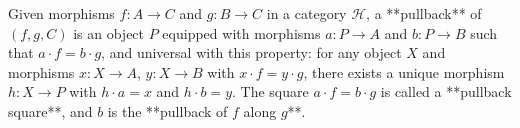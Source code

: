 Given morphisms $f: A \longrightarrow C$ and $g: B \longrightarrow C$ in a category $\mathcal{H}$, a **pullback** of $(f, g, C)$ is an object $P$ equipped with morphisms $a: P \longrightarrow A$ and $b: P \longrightarrow B$ such that $a \cdot f = b \cdot g$, and universal with this property: for any object $X$ and morphisms $x: X \longrightarrow A$, $y: X \longrightarrow B$ with $x \cdot f = y \cdot g$, there exists a unique morphism $h: X \longrightarrow P$ with $h \cdot a = x$ and $h \cdot b = y$. The square $a \cdot f = b \cdot g$ is called a **pullback square**, and $b$ is the **pullback of $f$ along $g$**.
